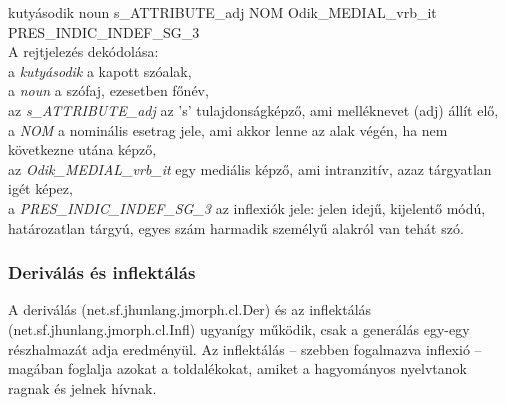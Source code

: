 \documentclass{article}
\begin{document}
kuty\'asodik      noun s\_ATTRIBUTE\_adj NOM Odik\_MEDIAL\_vrb\_it PRES\_INDIC\_INDEF\_SG\_3 \\


A rejtjelez\'es dek\'odol\'asa: \\
a \textit{kuty\'asodik} a kapott sz\'oalak, \\
a \textit{noun} a sz\'ofaj, ezesetben f\H{o}n\'ev, \\
az \textit{s\_ATTRIBUTE\_adj} az 's' tulajdons\'agk\'epz\H{o}, ami mell\'eknevet (adj) \'all\'{i}t el\H{o}, \\
a \textit{NOM} a nomin\'alis esetrag jele, ami akkor lenne az alak v\'eg\'en, ha nem k\"ovetkezne ut\'ana k\'epz\H{o}, \\ %
az \textit{Odik\_MEDIAL\_vrb\_it} egy medi\'alis k\'epz\H{o}, ami intranzit\'{i}v, azaz t\'argyatlan ig\'et k\'epez, \\
a \textit{PRES\_INDIC\_INDEF\_SG\_3} az inflexi\'ok jele: jelen idej\H{u}, kijelent\H{o} m\'od\'u, hat\'arozatlan t\'argy\'u, egyes sz\'am harmadik szem\'ely\H{u} alakr\'ol van teh\'at sz\'o. \par

\subsubsection{Deriv\'al\'as \'es inflekt\'al\'as}

A deriv\'al\'as (net.sf.jhunlang.jmorph.cl.Der) \'es az inflekt\'al\'as (net.sf.jhunlang.jmorph.cl.Infl) ugyan\'{i}gy m\H{u}k\"odik, csak a gener\'al\'as egy-egy r\'eszhalmaz\'at adja eredm\'eny\"ul. Az inflekt\'al\'as -- szebben fogalmazva inflexi\'o -- mag\'aban foglalja azokat a toldal\'ekokat, amiket a hagyom\'anyos nyelvtanok ragnak \'es jelnek h\'{i}vnak. \par
\end{document}
